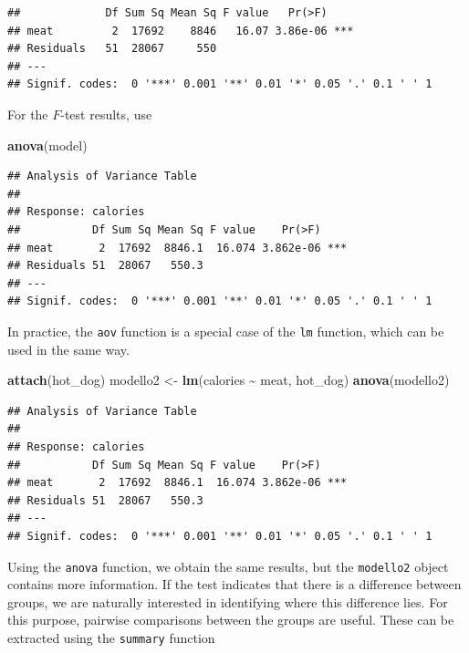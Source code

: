 \documentclass[
]{article}
\newenvironment{Shaded}{\begin{snugshade}}{\end{snugshade}}
\newcommand{\FunctionTok}[1]{\textcolor[rgb]{0.13,0.29,0.53}{\textbf{#1}}}
\newcommand{\NormalTok}[1]{#1}
\newcommand{\OtherTok}[1]{\textcolor[rgb]{0.56,0.35,0.01}{#1}}
\newcommand{\SpecialCharTok}[1]{\textcolor[rgb]{0.81,0.36,0.00}{\textbf{#1}}}
\begin{document}
\begin{verbatim}
##             Df Sum Sq Mean Sq F value   Pr(>F)    
## meat         2  17692    8846   16.07 3.86e-06 ***
## Residuals   51  28067     550                     
## ---
## Signif. codes:  0 '***' 0.001 '**' 0.01 '*' 0.05 '.' 0.1 ' ' 1
\end{verbatim}

For the \(F\)-test results, use

\begin{Shaded}
\begin{Highlighting}[]
\FunctionTok{anova}\NormalTok{(model)}
\end{Highlighting}
\end{Shaded}

\begin{verbatim}
## Analysis of Variance Table
## 
## Response: calories
##           Df Sum Sq Mean Sq F value    Pr(>F)    
## meat       2  17692  8846.1  16.074 3.862e-06 ***
## Residuals 51  28067   550.3                      
## ---
## Signif. codes:  0 '***' 0.001 '**' 0.01 '*' 0.05 '.' 0.1 ' ' 1
\end{verbatim}

In practice, the \texttt{aov} function is a special case of the
\texttt{lm} function, which can be used in the same way.

\begin{Shaded}
\begin{Highlighting}[]
\FunctionTok{attach}\NormalTok{(hot\_dog)}
\NormalTok{modello2 }\OtherTok{\textless{}{-}} \FunctionTok{lm}\NormalTok{(calories }\SpecialCharTok{\textasciitilde{}}\NormalTok{ meat, hot\_dog)}
\FunctionTok{anova}\NormalTok{(modello2)}
\end{Highlighting}
\end{Shaded}

\begin{verbatim}
## Analysis of Variance Table
## 
## Response: calories
##           Df Sum Sq Mean Sq F value    Pr(>F)    
## meat       2  17692  8846.1  16.074 3.862e-06 ***
## Residuals 51  28067   550.3                      
## ---
## Signif. codes:  0 '***' 0.001 '**' 0.01 '*' 0.05 '.' 0.1 ' ' 1
\end{verbatim}

Using the \texttt{anova} function, we obtain the same results, but the
\texttt{modello2} object contains more information. If the test
indicates that there is a difference between groups, we are naturally
interested in identifying where this difference lies. For this purpose,
pairwise comparisons between the groups are useful. These can be
extracted using the \texttt{summary} function
\end{document}

